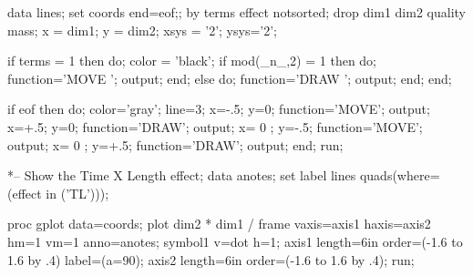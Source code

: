 \begin{listing}

data lines;
   set coords end=eof;;
   by terms effect notsorted;
   drop dim1 dim2 quality mass;
   x = dim1;
   y = dim2;
   xsys = '2'; ysys='2';

   if terms = 1  then do;
   color = 'black';
   if mod(_n_,2) = 1
      then do; function='MOVE    '; output; end;
      else do; function='DRAW    '; output; end;
   end;   

   if eof then do;
      color='gray'; line=3;
      x=-.5;  y=0;   function='MOVE';  output;   
      x=+.5;  y=0;   function='DRAW';  output;   
      x= 0 ;  y=-.5; function='MOVE';  output;   
      x= 0 ;  y=+.5; function='DRAW';  output;
      end;   
run;

*-- Show the Time X Length effect;
data anotes;
   set label lines quads(where=(effect in ('TL')));

proc gplot data=coords;
   plot dim2 * dim1 
      / frame vaxis=axis1 haxis=axis2 hm=1 vm=1
      anno=anotes;
   symbol1 v=dot h=1;
   axis1  length=6in order=(-1.6 to 1.6 by .4) label=(a=90);
   axis2  length=6in order=(-1.6 to 1.6 by .4);
run;
\end{listing}
